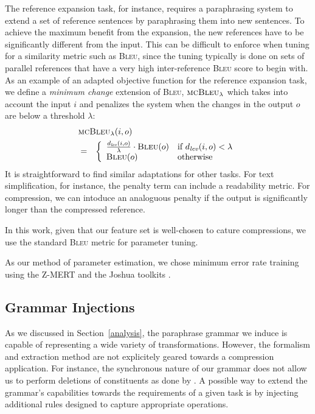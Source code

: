 \documentclass[11pt]{article}
\begin{document}
The reference expansion task, for instance, requires a paraphrasing
system to extend a set of reference sentences by paraphrasing them
into new sentences. To achieve the maximum benefit from the expansion,
the new references have to be significantly different from the
input. This can be difficult to enforce when tuning for a similarity
metric such as \textsc{Bleu}, since the tuning typically is done on
sets of parallel references that have a very high inter-reference
\textsc{Bleu} score to begin with. As an example of an adapted
objective function for the reference expansion task, we define a
\emph{minimum change} extension of \textsc{Bleu},
$\textsc{mcBleu}_\lambda$ which takes into account the input $i$ and
penalizes the system when the changes in the output $o$ are below a
threshold $\lambda$:
\begin{eqnarray}
  \lefteqn{ \textsc{mcBleu}_\lambda(i, o) } \nonumber\\
  &=& \left\{ \begin{array}{ll}
      \frac{d_{\mathit{lev}}(i, o)}{\lambda} \cdot \textsc{Bleu}(o) & \textrm{if
        $d_{\mathit{lev}}(i, o) <\lambda$} \nonumber \\ 
      \textsc{Bleu}(o) & \textrm{otherwise}
\end{array} \right.
\end{eqnarray} 
It is straightforward to find similar adaptations for other tasks. For
text simplification, for instance, the penalty term can include a
readability metric. For compression, we can intoduce an analoguous
penalty if the output is significantly longer than the compressed
reference.

In this work, given that our feature set is well-chosen to cature
compressions, we use the standard \textsc{Bleu} metric for parameter
tuning.

As our method of parameter estimation, we chose minimum error rate
training \cite{Och2003c} using the Z-MERT and the Joshua toolkits
\cite{Zaidan2009,Joshua-WMT}.



\subsection{Grammar Injections} \label{injection}

As we discussed in Section~\ref{analysis}, the paraphrase grammar we
induce is capable of representing a wide variety of
transformations. However, the formalism and extraction method are not
explicitely geared towards a compression application. For instance,
the synchronous nature of our grammar does not allow us to perform
deletions of constituents as done by .  A possible
way to extend the grammar's capabilities towards the requirements of a
given task is by injecting additional rules designed to capture
appropriate operations. 
\end{document}
